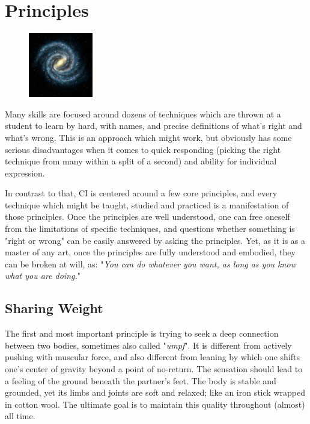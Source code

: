 \section{Principles}

\begin{figure}
\centering
\includegraphics[width=0.25\textwidth]{images/principles.jpg}
\end{figure}

Many skills are focused around dozens of techniques which are thrown at a student to learn by hard, with names, and precise definitions of what's right and what's wrong. This is an approach which might work, but obviously has some serious disadvantages when it comes to quick responding (picking the right technique from many within a split of a second) and ability for individual expression.

In contrast to that, CI is centered around a few core principles, and every technique which might be taught, studied and practiced is a manifestation of those principles. Once the principles are well understood, one can free oneself from the limitations of specific techniques, and questions whether something is "right or wrong" can be easily answered by asking the principles. Yet, as it is as a master of any art, once the principles are fully understood and embodied, they can be broken at will, as: "\textit{You can do whatever you want, as long as you know what you are doing.}"

\subsection{Sharing Weight}

The first and most important principle is trying to seek a deep connection between two bodies, sometimes also called "\textit{umpf}". It is different from actively pushing with muscular force, and also different from leaning by which one shifts one's center of gravity beyond a point of no-return. The sensation should lead to a feeling of the ground beneath the partner's feet. The body is stable and grounded, yet its limbs and joints are soft and relaxed; like an iron stick wrapped in cotton wool. The ultimate goal is to maintain this quality throughout (almost) all time.

